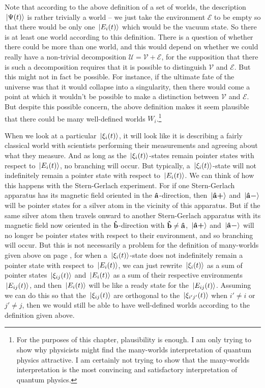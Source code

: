     Note that according to the above definition of a set of worlds, the description $\ket*{\Psi(t)}$ is rather trivially a world -- we just take the environment $\mathcal{E}$ to be empty so that there would be only one $\ket*{E_i(t)}$ which would be the vacuum state. So there is at least one world according to this definition. There is a question of whether there could be more than one world, and this would depend on whether we could really have a non-trivial decomposition $\mathcal{U}=\mathcal{V}+\mathcal{E}$, 
    for the supposition that there is such a decomposition requires that it is possible to distinguish $\mathcal{V}$ and $\mathcal{E}$. But this might not in fact be possible. For instance, if the ultimate fate of the universe was that it would collapse into a singularity, then there would come a point at which it wouldn't be possible to make a distinction between $\mathcal{V}$ and $\mathcal{E}$. But despite this possible concern, the above definition makes it seem plausible that there could be many well-defined worlds $W_i$.\footnote{For the purposes of this chapter, plausibility is enough. I am only trying to show why physicists might find the many-worlds interpretation of quantum physics attractive. I am certainly not trying to show that the many-worlds interpretation is the most convincing and satisfactory interpretation of quantum physics. }
    
    When we look at a particular $\ket*{\xi_i(t)}$, it will look like it is describing a fairly classical world with scientists performing their measurements and agreeing about what they measure. And as long as the $\ket*{\xi_i(t)}$-states remain pointer states with respect to $\ket*{E_i(t)}$, no branching will occur. But typically, a $\ket*{\xi_i(t)}$-state will not indefinitely remain a pointer state with respect to $\ket*{E_i(t)}$. We can think of how this happens with the Stern-Gerlach experiment. For if one Stern-Gerlach apparatus has its magnetic field oriented in the $\vb{\hat{{a}}}$-direction, then $\ket*{{\vb{\hat{{a}}}\bm{+}}}$ and $\ket*{{\vb{\hat{{a}}}\bm{-}}}$ will be pointer states for a silver atom in the vicinity of this apparatus. But if the same silver atom then travels onward to another Stern-Gerlach apparatus with its magnetic field now oriented in the $\vb{\hat{{b}}}$-direction with $\vb{\hat{{b}}}\neq\vb{\hat{{a}}}$, $\ket*{{\vb{\hat{{a}}}\bm{+}}}$ and $\ket*{{\vb{\hat{{a}}}\bm{-}}}$ will no longer be pointer states with respect to their environment, and so branching will occur. But this is not necessarily a problem for the definition of many-worlds given above on page \pageref{rigorousworld}, for when a $\ket*{\xi_i(t)}$-state does not indefinitely remain a pointer state with respect to $\ket*{E_i(t)}$, we can just rewrite $\ket*{\xi_i(t)}$ as a sum of pointer states $\ket*{\xi_{ij}(t)}$ and $\ket*{E_i(t)}$  as a sum of their respective environments $\ket*{E_{ij}(t)}$, and then $\ket*{E_i(t)}$ will be like a ready state for the $\ket*{E_{ij}(t)}$. Assuming we can do this so that the $\ket*{\xi_{ij}(t)}$ are orthogonal to the $\ket*{\xi_{i'j'}(t)}$ when $i'\neq i$ or $j'\neq j$, then we would still be able to have well-defined worlds according to the definition given above. 




   